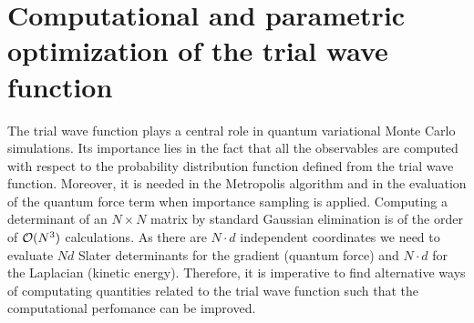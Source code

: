 \chapter{Computational and parametric optimization of the trial wave function}\label{TWF}
The trial wave function plays a central role in quantum variational Monte Carlo simulations. Its importance lies in the fact that all the observables are computed with respect to the probability distribution function defined from the trial wave function. Moreover, it is needed in the Metropolis algorithm and in the evaluation of the quantum force term when importance sampling is applied. Computing a determinant of an $N \times N$ matrix by standard Gaussian elimination is of the order of ${\cal O}(N^3)$ calculations. As there are $N\cdot d$ independent coordinates we need to evaluate $Nd$ Slater determinants for the gradient (quantum force) and $N\cdot d$ for the Laplacian (kinetic energy). Therefore, it is imperative 
to find alternative ways of computating quantities related to the trial wave function such that the computational perfomance can be improved.


